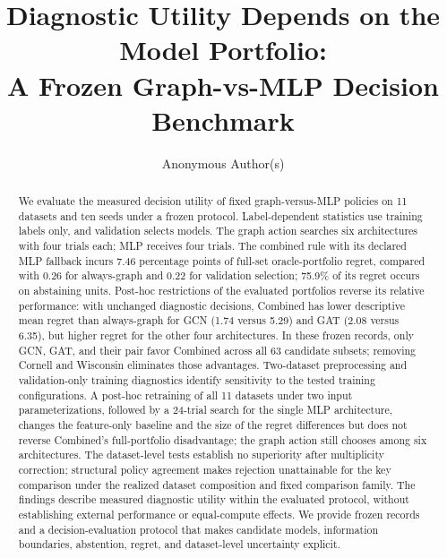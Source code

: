 \documentclass[10pt]{article}
\title{Diagnostic Utility Depends on the Model Portfolio:\\
A Frozen Graph-vs-MLP Decision Benchmark}
\author{Anonymous Author(s)}
\date{}
\begin{document}
\maketitle

\begingroup
\renewcommand{\thefootnote}{}
\endgroup

\begin{abstract}
We evaluate the measured decision utility of fixed graph-versus-MLP policies on 11 datasets and ten seeds under a frozen protocol. Label-dependent statistics use training labels only, and validation selects models. The graph action searches six architectures with four trials each; MLP receives four trials. The combined rule with its declared MLP fallback incurs 7.46 percentage points of full-set oracle-portfolio regret, compared with 0.26 for always-graph and 0.22 for validation selection; 75.9\% of its regret occurs on abstaining units. Post-hoc restrictions of the evaluated portfolios reverse its relative performance: with unchanged diagnostic decisions, Combined has lower descriptive mean regret than always-graph for GCN (1.74 versus 5.29) and GAT (2.08 versus 6.35), but higher regret for the other four architectures. In these frozen records, only GCN, GAT, and their pair favor Combined across all 63 candidate subsets; removing Cornell and Wisconsin eliminates those advantages. Two-dataset preprocessing and validation-only training diagnostics identify sensitivity to the tested training configurations. A post-hoc retraining of all 11 datasets under two input parameterizations, followed by a 24-trial search for the single MLP architecture, changes the feature-only baseline and the size of the regret differences but does not reverse Combined's full-portfolio disadvantage; the graph action still chooses among six architectures. The dataset-level tests establish no superiority after multiplicity correction; structural policy agreement makes rejection unattainable for the key comparison under the realized dataset composition and fixed comparison family. The findings describe measured diagnostic utility within the evaluated protocol, without establishing external performance or equal-compute effects. We provide frozen records and a decision-evaluation protocol that makes candidate models, information boundaries, abstention, regret, and dataset-level uncertainty explicit.
\end{abstract}









\end{document}
